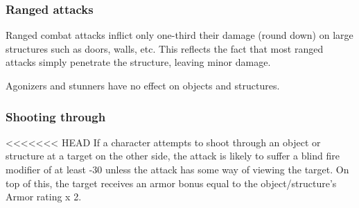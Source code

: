 \subsubsection{Ranged attacks}

Ranged combat attacks inflict only one-third their damage (round down) on large structures such as doors, walls, etc. This reflects the fact that most ranged attacks simply penetrate the structure, leaving minor damage.

Agonizers and stunners have no effect on objects and structures.

\subsubsection{Shooting through}

<<<<<<< HEAD
If a character attempts to shoot through an object or structure at a target on the other side, the attack is likely to suffer a blind fire modifier of at least -30 unless the attack has some way of viewing the target. On top of this, the target receives an armor bonus equal to the object/structure’s Armor rating x 2.


